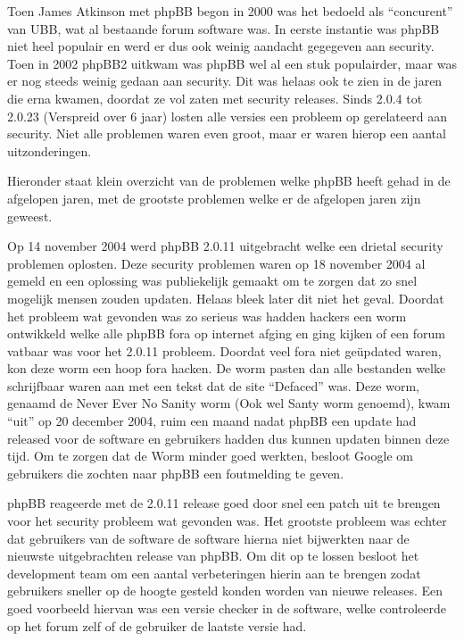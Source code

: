 Toen James Atkinson met phpBB begon in 2000 was het bedoeld als ``concurent'' van UBB, wat al bestaande forum software was. In eerste instantie was phpBB niet heel populair en werd er dus ook weinig aandacht gegegeven aan security. Toen in 2002 phpBB2 uitkwam was phpBB wel al een stuk populairder, maar was er nog steeds weinig gedaan aan security. Dit was helaas ook te zien in de jaren die erna kwamen, doordat ze vol zaten met security releases. Sinds 2.0.4 tot 2.0.23 (Verspreid over 6 jaar) losten alle versies een probleem op gerelateerd aan security. Niet alle problemen waren even groot, maar er waren hierop een aantal uitzonderingen.

Hieronder staat klein overzicht van de problemen welke phpBB heeft gehad in de afgelopen jaren, met de grootste problemen welke er de afgelopen jaren zijn geweest.

Op 14 november 2004 werd phpBB 2.0.11 uitgebracht\cite{bib.phpbb.history.2011} welke een drietal security problemen oplosten. Deze security problemen waren op 18 november 2004 al gemeld en een oplossing was publiekelijk gemaakt\cite{bib.phpbb.history.2011a} om te zorgen dat zo snel mogelijk mensen zouden updaten. Helaas bleek later dit niet het geval\cite{bib.phpbb.history.2011b}. Doordat het probleem wat gevonden was zo serieus was hadden hackers een worm ontwikkeld welke alle phpBB fora op internet afging en ging kijken of een forum vatbaar was voor het 2.0.11 probleem. Doordat veel fora niet ge\"{u}pdated waren, kon deze worm een hoop fora hacken. De worm pasten dan alle bestanden welke schrijfbaar waren aan met een tekst dat de site ``Defaced'' was. Deze worm, genaamd de Never Ever No Sanity worm (Ook wel Santy worm genoemd), kwam ``uit'' op 20 december 2004\cite{bib.phpbb.history.2011c}, ruim een maand nadat phpBB een update had released voor de software en gebruikers hadden dus kunnen updaten binnen deze tijd. Om te zorgen dat de Worm minder goed werkten, besloot Google om gebruikers die zochten naar phpBB een foutmelding te geven\cite{bib.phpbb.history.google}.

phpBB reageerde met de 2.0.11 release goed door snel een patch uit te brengen voor het security probleem wat gevonden was. Het grootste probleem was echter dat gebruikers van de software de software hierna niet bijwerkten naar de nieuwste uitgebrachten release van phpBB. Om dit op te lossen besloot het development team om een aantal verbeteringen hierin aan te brengen zodat gebruikers sneller op de hoogte gesteld konden worden van nieuwe releases. Een goed voorbeeld hiervan was een versie checker in de software, welke controleerde op het forum zelf of de gebruiker de laatste versie had\cite{bib.phpbb.history.2012}.

